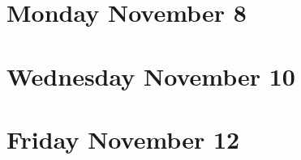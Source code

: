

\section*{Monday November 8}




\newpage
\section*{Wednesday November 10}



\newpage
\section*{Friday November 12}





